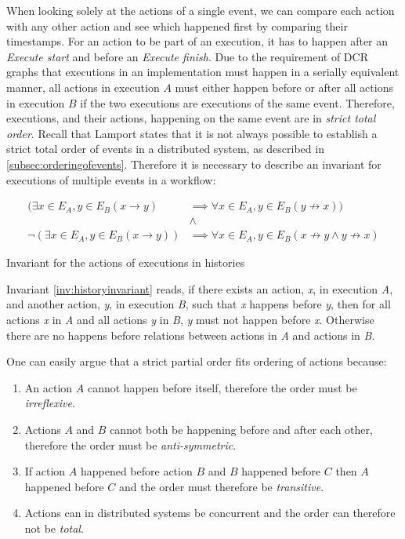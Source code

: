     \newpar When looking solely at the actions of a single event, we can compare each action with any other action and see which happened first by comparing their timestamps. For an action to be part of an execution, it has to happen after an \textit{Execute start} and before an \textit{Execute finish}. Due to the requirement of DCR graphs that executions in an implementation must happen in a serially equivalent manner, all actions in execution $A$ must either happen before or after all actions in execution $B$ if the two executions are executions of the same event. Therefore, executions, and their actions, happening on the same event are in  \textit{strict total order}. Recall that Lamport states that it is not always possible to establish a strict total order of events in a distributed system, as described in \autoref{subsec:orderingofevents}. Therefore it is necessary to describe an invariant for executions of multiple events in a workflow:
	
	\begin{invariant}
		\begin{align*}
			(\exists{x\in E_A, y\in E_B}(x\rightarrow y) &\implies \forall{x\in E_A, y\in E_B}(y\not\rightarrow x))\\
			&\land \\
			\lnot(\exists{x\in E_A, y\in E_B}(x \rightarrow y)) &\implies \forall{x\in E_A, y\in E_B}(x\not\rightarrow y\land y\not\rightarrow x)
		\end{align*}
		\caption{Invariant for the actions of executions in histories}
		\label{inv:historyinvariant}
	\end{invariant}
	
	\newpar
	Invariant \ref{inv:historyinvariant} reads, if there exists an action, \textit{x}, in execution \textit{A}, and another action, \textit{y}, in execution \textit{B}, such that \textit{x} happens before \textit{y}, then for all actions \textit{x} in \textit{A} and all actions \textit{y} in \textit{B}, \textit{y} must not happen before \textit{x}. Otherwise there are no happens before relations between actions in \textit{A} and actions in \textit{B}.
    
	\newpar One can easily argue that a strict partial order fits ordering of actions because:
	\begin{enumerate}
		\item An action $A$ cannot happen before itself, therefore the order must be \textit{irreflexive}.
		\item Actions $A$ and $B$ cannot both be happening before and after each other, therefore the order must be \textit{anti-symmetric}.
		\item If action $A$ happened before action $B$ and $B$ happened before $C$ then $A$ happened before $C$ and the order must therefore be \textit{transitive}.
		\item Actions can in distributed systems be concurrent and the order can therefore not be \textit{total}.
	\end{enumerate}
	
